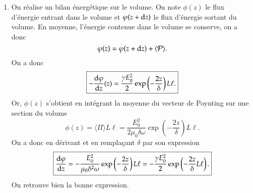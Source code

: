 \begin{corrige}
\begin{enumerate}
	\item On réalise un bilan énergétique sur le volume. On note $\phi(z)$
	      le flux d'énergie entrant dans le volume et $\varphi(z + \mathrm{d}z)$ le
	      flux d'énergie sortant du volume. En moyenne, l'énergie contenue
	      dans le volume se conserve, on a donc
	      \begin{equation*}
		      \varphi(z) = \varphi(z + \mathrm{d}z) + \langle \mathcal{P} \rangle.
	      \end{equation*}
	      On a donc
	      \begin{equation*}
		      \boxed{
		      -\dfrac{\mathrm{d} \varphi}{\mathrm{d} z}(z) = \dfrac{\gamma E_0^2}{2} 
		      \exp\left(-\dfrac{2z}{\delta}\right) L \ell.
	      }
      	      \end{equation*}
	      Or, $\phi(z)$ s'obtient en intégrant la moyenne du vecteur de 
	      Poynting sur une section du volume
	      \begin{equation*}
		      \phi(z) = \langle \Pi \rangle L \ell = 
		      	   \dfrac{E_0^2}{2 \mu_0 \delta \omega} \exp\left(
			    - \dfrac{2z}{\delta}\right) L \ell.
	      \end{equation*}
	      On a donc en dérivant et en remplaçant $\delta$ par son expression
	      \begin{equation*}
		      \boxed{
		      \dfrac{\mathrm{d} \varphi}{\mathrm{d} z} = -\dfrac{E_0^2}{\mu_0 \delta^2 \omega}
		      \exp\left(-\dfrac{2z}{\delta}\right)L \ell=
		      - \dfrac{\gamma E_0^2}{2} \exp\left(-\dfrac{2z}{\delta} L \ell
			      \right).
		      }
	     \end{equation*}
	     On retrouve bien la bonne expression.
\end{enumerate}
\end{corrige}
